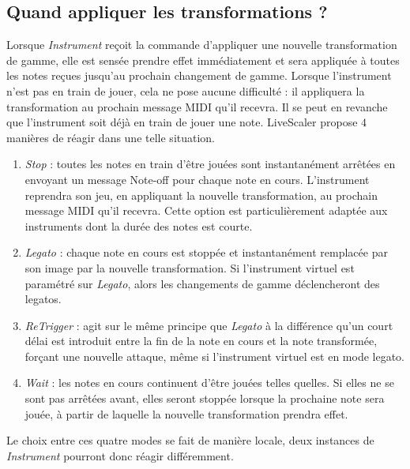 \subsection{Quand appliquer les transformations ? }
Lorsque \emph{Instrument} reçoit la commande d'appliquer une nouvelle transformation de gamme, elle est sensée prendre effet immédiatement et sera appliquée à toutes les notes reçues jusqu'au prochain changement de gamme. Lorsque l'instrument n'est pas en train de jouer, cela ne pose aucune difficulté : il appliquera la transformation au prochain message MIDI qu'il recevra. Il se peut en revanche que l'instrument soit déjà en train de jouer une note. LiveScaler propose $4$ manières de réagir dans une telle situation. 


\begin{enumerate}
  \item \emph{Stop} : toutes les notes en train d'être jouées sont instantanément arrêtées en envoyant un message Note-off pour chaque note en cours. L'instrument reprendra son jeu, en appliquant la nouvelle transformation, au prochain message MIDI qu'il recevra. Cette option est particulièrement adaptée aux instruments dont la durée des notes est courte. 
  \item \emph{Legato} : chaque note en cours est stoppée et instantanément remplacée par son image par la nouvelle transformation. Si l'instrument virtuel est paramétré sur \emph{Legato}, alors les changements de gamme déclencheront des legatos.
  \item \emph{ReTrigger} : agit sur le même principe que \emph{Legato} à la différence  qu'un court délai est introduit entre la fin de la note en cours et la note transformée, forçant une nouvelle attaque, même si l'instrument virtuel est en mode legato.
  \item \emph{Wait} : les notes en cours continuent d'être jouées telles quelles. Si elles ne se sont pas arrêtées avant, elles seront stoppée lorsque la prochaine note sera jouée, à partir de laquelle la nouvelle transformation prendra effet.
\end{enumerate}

Le choix entre ces quatre modes se fait de manière locale, deux instances de \emph{Instrument} pourront donc réagir différemment.
